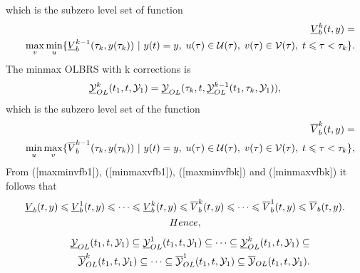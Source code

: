 \documentclass[letterpaper,10pt,english]{sphinxmanual}
\begin{document}
which is the subzero level set of function
\begin{gather}
\begin{split}\begin{aligned}
&&\underline{V}^k_b(t, y) = \nonumber \\
&&\max_v\min_u\{\underline{V}^{k-1}_b(\tau_k, y(\tau_k)) ~|~
y(t)=y, \; u(\tau)\in{\mathcal U}(\tau), \;
v(\tau)\in{\mathcal V}(\tau), \; t\leqslant\tau<\tau_k\}.
\label{maxminvfbk}\end{aligned}\end{split}\notag
\end{gather}
The minmax OLBRS with k corrections is
\begin{gather}
\begin{split}\underline{{\mathcal Y}}_{OL}^k(t_1, t, {\mathcal Y}_1) = \underline{{\mathcal Y}}_{OL}(\tau_k, t, \underline{{\mathcal Y}}_{OL}^{k-1}(t_1, \tau_k, {\mathcal Y}_1)),
\label{minmaxbk}\end{split}\notag
\end{gather}
which is the subzero level set of the function
\begin{gather}
\begin{split}\begin{aligned}
&&\overline{V}^k_b(t, y) = \nonumber \\
&&\min_u\max_v\{\overline{V}^{k-1}_b(\tau_k, y(\tau_k)) ~|~
y(t)=y, \; u(\tau)\in{\mathcal U}(\tau), \;
v(\tau)\in{\mathcal V}(\tau), \; t\leqslant\tau<\tau_k\},
\label{minmaxvfbk}\end{aligned}\end{split}\notag
\end{gather}
From ({[}maxminvfb1{]}), ({[}minmaxvfb1{]}), ({[}maxminvfbk{]}) and ({[}minmaxvfbk{]})
it follows that
\begin{gather}
\begin{split}  \underline{V}_b(t, y) \leqslant\underline{V}^1_b(t, y)\leqslant\cdots
  \leqslant\underline{V}^k_b(t, y) \leqslant\overline{V}^k_b(t, y) \leqslant\cdots
  \leqslant\overline{V}^1_b(t, y) \leqslant\overline{V}_b(t, y) .\end{split}\notag\\\begin{split}Hence,\end{split}\notag
\end{gather}\begin{gather}
\begin{split}\begin{aligned}
&&\underline{{\mathcal Y}}_{OL}(t_1, t, {\mathcal Y}_1) \subseteq \underline{{\mathcal Y}}_{OL}^1(t_1, t, {\mathcal Y}_1) \subseteq \cdots
\subseteq \underline{{\mathcal Y}}_{OL}^k(t_1, t, {\mathcal Y}_1) \subseteq \nonumber \\
&&\overline{{\mathcal Y}}_{OL}^k(t_1, t, {\mathcal Y}_1) \subseteq \cdots \subseteq \overline{{\mathcal Y}}_{OL}^1(t_1, t, {\mathcal Y}_1)
\subseteq \overline{{\mathcal Y}}_{OL}(t_1, t, {\mathcal Y}_1) .
\label{olbrsinclusion}\end{aligned}\end{split}\notag
\end{gather}
\end{document}

